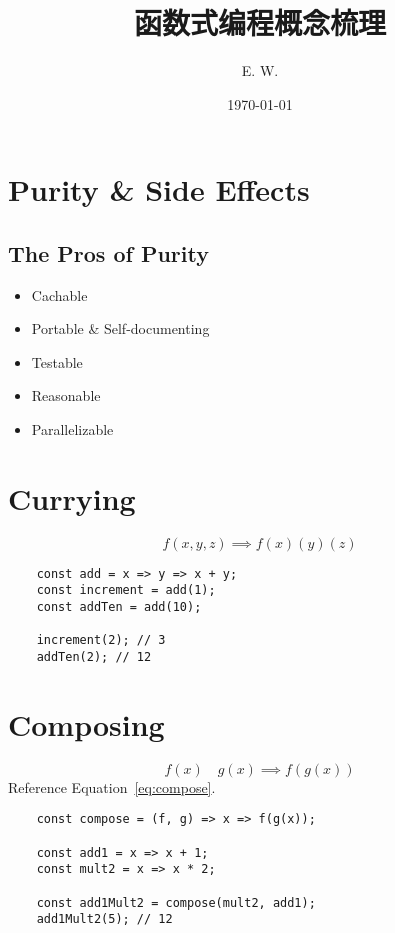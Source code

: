 \documentclass[UTF8]{ctexart}
\title{函数式编程概念梳理}
\author{E. W.}
\date{\today}
\begin{document}
\maketitle
\tableofcontents

\section{Purity \& Side Effects}
\subsection{The Pros of Purity}
\begin{itemize}
    \item Cachable
    \item Portable \& Self-documenting
    \item Testable
    \item Reasonable
    \item Parallelizable
\end{itemize}

\section{Currying}

\begin{equation}
    f(x,y,z) \implies  f(x)(y)(z)
\end{equation}

\begin{lstlisting}
    const add = x => y => x + y;
    const increment = add(1);
    const addTen = add(10);

    increment(2); // 3
    addTen(2); // 12
\end{lstlisting}

\section{Composing}

\begin{equation}
    f(x) \quad g(x) \implies f(g(x)) \label{eq:compose}
\end{equation}
Reference Equation~\eqref{eq:compose}.

\begin{lstlisting}
    const compose = (f, g) => x => f(g(x));

    const add1 = x => x + 1;
    const mult2 = x => x * 2;

    const add1Mult2 = compose(mult2, add1);
    add1Mult2(5); // 12
\end{lstlisting}
\end{document}
